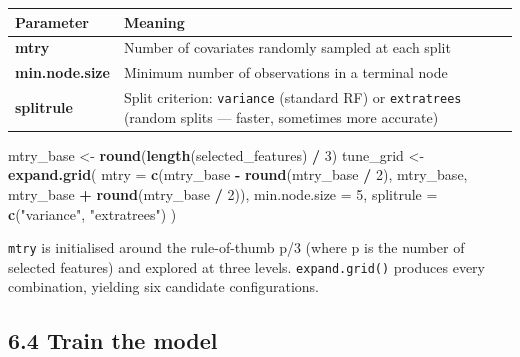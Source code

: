 \documentclass[
  10pt,
  b5paper,
  oneside]{book}
\newenvironment{Shaded}{\begin{snugshade}}{\end{snugshade}}
\newcommand{\AttributeTok}[1]{\textcolor[rgb]{0.13,0.29,0.53}{#1}}
\newcommand{\DecValTok}[1]{\textcolor[rgb]{0.00,0.00,0.81}{#1}}
\newcommand{\FunctionTok}[1]{\textcolor[rgb]{0.13,0.29,0.53}{\textbf{#1}}}
\newcommand{\NormalTok}[1]{#1}
\newcommand{\OtherTok}[1]{\textcolor[rgb]{0.56,0.35,0.01}{#1}}
\newcommand{\SpecialCharTok}[1]{\textcolor[rgb]{0.81,0.36,0.00}{\textbf{#1}}}
\newcommand{\StringTok}[1]{\textcolor[rgb]{0.31,0.60,0.02}{#1}}
\begin{document}
\begin{longtable}[]{@{}
  >{\raggedright\arraybackslash}p{}
  >{\raggedright\arraybackslash}p{}@{}}
\toprule\noalign{}
\begin{minipage}[b]{\linewidth}\raggedright
Parameter
\end{minipage} & \begin{minipage}[b]{\linewidth}\raggedright
Meaning
\end{minipage} \\
\midrule\noalign{}
\endhead
\bottomrule\noalign{}
\endlastfoot
\textbf{mtry} & Number of covariates randomly sampled at each split \\
\textbf{min.node.size} & Minimum number of observations in a terminal node \\
\textbf{splitrule} & Split criterion: \texttt{variance} (standard RF) or \texttt{extratrees} (random splits --- faster, sometimes more accurate) \\
\end{longtable}

\begin{Shaded}
\begin{Highlighting}[]
\NormalTok{mtry\_base }\OtherTok{\textless{}{-}} \FunctionTok{round}\NormalTok{(}\FunctionTok{length}\NormalTok{(selected\_features) }\SpecialCharTok{/} \DecValTok{3}\NormalTok{)}
\NormalTok{tune\_grid }\OtherTok{\textless{}{-}} \FunctionTok{expand.grid}\NormalTok{(}
  \AttributeTok{mtry          =} \FunctionTok{c}\NormalTok{(mtry\_base }\SpecialCharTok{{-}} \FunctionTok{round}\NormalTok{(mtry\_base }\SpecialCharTok{/} \DecValTok{2}\NormalTok{),}
\NormalTok{                    mtry\_base,}
\NormalTok{                    mtry\_base }\SpecialCharTok{+} \FunctionTok{round}\NormalTok{(mtry\_base }\SpecialCharTok{/} \DecValTok{2}\NormalTok{)),}
  \AttributeTok{min.node.size =} \DecValTok{5}\NormalTok{,}
  \AttributeTok{splitrule     =} \FunctionTok{c}\NormalTok{(}\StringTok{"variance"}\NormalTok{, }\StringTok{"extratrees"}\NormalTok{)}
\NormalTok{)}
\end{Highlighting}
\end{Shaded}

\texttt{mtry} is initialised around the rule-of-thumb p/3 (where p is the number of selected features) and explored at three levels. \texttt{expand.grid()} produces every combination, yielding six candidate configurations.

\subsection*{6.4 Train the model}\label{train-the-model}
\end{document}
